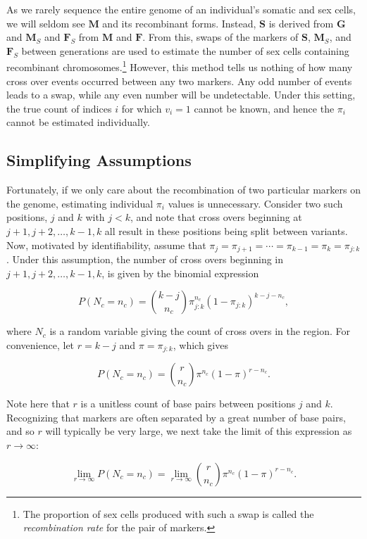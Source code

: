 \documentclass{article}
\newcommand{\m}[1]{\mathbf{#1}}               %
\begin{document}
As we rarely sequence the entire genome of an individual's somatic and sex cells, we will seldom see $\m{M}$ and its recombinant forms. Instead, $\m{S}$ is derived from $\m{G}$ and $\m{M}_S$ and $\m{F}_S$ from $\m{M}$ and $\m{F}$. From this, swaps of the markers of $\m{S}$, $\m{M}_S$, and $\m{F}_S$ between generations are used to estimate the number of sex cells containing recombinant chromosomes.\footnote{The proportion of sex cells produced with such a swap is called the \textit{recombination rate} for the pair of markers.} However, this method tells us nothing of how many cross over events occurred between any two markers. Any odd number of events leads to a swap, while any even number will be undetectable. Under this setting, the true count of indices $i$ for which $v_i = 1$ cannot be known, and hence the $\pi_i$ cannot be estimated individually.

\subsection{Simplifying Assumptions} \label{subsec:simplify}

Fortunately, if we only care about the recombination of two particular markers on the genome, estimating individual $\pi_i$ values is unnecessary. Consider two such positions, $j$ and $k$ with $j < k$, and note that cross overs beginning at $j+1, j+2, \dots, k-1, k$ all result in these positions being split between variants. Now, motivated by identifiability, assume that $\pi_j = \pi_{j+1} = \cdots = \pi_{k-1} = \pi_k = \pi_{j:k}$. Under this assumption, the number of cross overs beginning in $j+1,j+2,\dots,k-1,k$, is given by the binomial expression

$$P(N_c = n_c) = {k - j \choose n_c} \pi_{j:k}^{n_c} (1-\pi_{j:k})^{k - j - n_c},$$

\noindent where $N_c$ is a random variable giving the count of cross overs in the region. For convenience, let $r = k - j$ and $\pi = \pi_{j:k}$, which gives

$$P(N_c = n_c) = {r \choose n_c} \pi^{n_c} (1-\pi)^{r - n_c}.$$

\noindent Note here that $r$ is a unitless count of base pairs between positions $j$ and $k$. Recognizing that markers are often separated by a great number of base pairs, and so $r$ will typically be very large, we next take the limit of this expression as $r \rightarrow \infty$:

$$\lim_{r \rightarrow \infty} P(N_c = n_c) = \lim_{r \rightarrow \infty} {r \choose n_c} \pi^{n_c} (1-\pi)^{r - n_c}.$$
\end{document}
